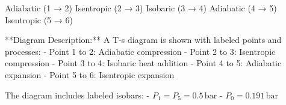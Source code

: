 Adiabatic (1 → 2)  
Isentropic (2 → 3)  
Isobaric (3 → 4)  
Adiabatic (4 → 5)  
Isentropic (5 → 6)  

**Diagram Description:**  
A T-s diagram is shown with labeled points and processes:  
- Point 1 to 2: Adiabatic compression  
- Point 2 to 3: Isentropic compression  
- Point 3 to 4: Isobaric heat addition  
- Point 4 to 5: Adiabatic expansion  
- Point 5 to 6: Isentropic expansion  

The diagram includes labeled isobars:  
- \( P_1 = P_5 = 0.5 \, \text{bar} \)  
- \( P_0 = 0.191 \, \text{bar} \)
